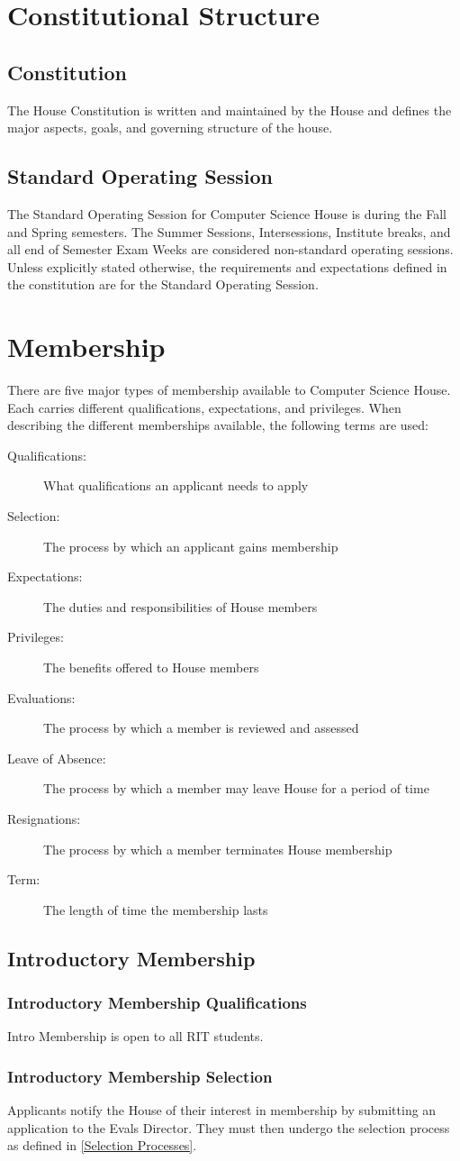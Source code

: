 \documentclass{article}
\newcommand{\article}[1]{\section{#1} \label{#1}}
\newcommand{\asection}[1]{\subsection{#1} \label{#1}}
\newcommand{\asubsection}[1]{\subsubsection{#1} \label{#1}}
\begin{document}
\article{Constitutional Structure}

\asection{Constitution}
The House Constitution is written and maintained by the House and defines the major aspects, goals, and governing structure of the house.

\asection{Standard Operating Session}
The Standard Operating Session for Computer Science House is during the Fall and Spring semesters.
The Summer Sessions, Intersessions, Institute breaks, and all end of Semester Exam Weeks are considered non-standard operating sessions.
Unless explicitly stated otherwise, the requirements and expectations defined in the constitution are for the Standard Operating Session.

\article{Membership}
There are five major types of membership available to Computer Science House.
Each carries different qualifications, expectations, and privileges.
When describing the different memberships available, the following terms are used:
\begin{description}
	\item[Qualifications:] What qualifications an applicant needs to apply
	\item[Selection:] The process by which an applicant gains membership
	\item[Expectations:] The duties and responsibilities of House members
	\item[Privileges:] The benefits offered to House members
	\item[Evaluations:] The process by which a member is reviewed and assessed
	\item[Leave of Absence:] The process by which a member may leave House for a period of time
	\item[Resignations:] The process by which a member terminates House membership
	\item[Term:] The length of time the membership lasts
\end{description}

\asection{Introductory Membership}

\asubsection{Introductory Membership Qualifications}
Intro Membership is open to all RIT students.

\asubsection{Introductory Membership Selection}
Applicants notify the House of their interest in membership by submitting an application to the Evals Director.
They must then undergo the selection process as defined in \ref{Selection Processes}.
\end{document}
